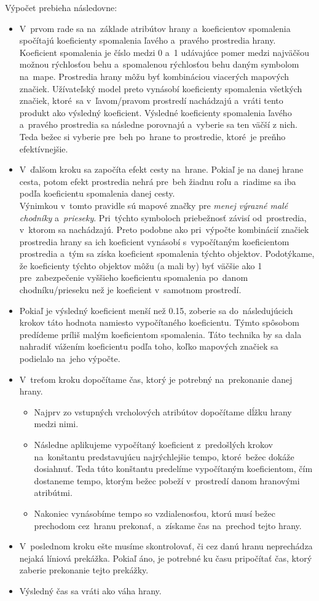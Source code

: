 Výpočet prebieha následovne:
\begin{itemize}
    \item V~prvom rade sa na~základe atribútov hrany a~koeficientov spomalenia spočítajú koeficienty spomalenia ľavého a~pravého prostredia hrany. Koeficient spomalenia je číslo medzi 0 a~1 udávajúce pomer medzi najväčšou možnou rýchlosťou behu a~spomalenou rýchlosťou behu daným symbolom na~mape. Prostredia hrany môžu byť kombináciou viacerých mapových značiek. Užívateľský model preto vynásobí koeficienty spomalenia všetkých značiek, ktoré~sa v~ľavom/pravom prostredí nachádzajú a~vráti tento produkt ako výsledný koeficient. Výsledné koeficienty spomalenia ľavého a~pravého prostredia sa následne porovnajú a~vyberie sa ten väčší z nich. Teda bežec si vyberie pre~beh po~hrane to prostredie, ktoré~je preňho efektívnejšie. 
    \item V~ďalšom kroku sa započíta efekt cesty na~hrane. Pokiaľ je na danej hrane cesta, potom efekt prostredia nehrá pre~beh žiadnu roľu a~riadime sa iba podľa koeficientu spomalenia danej cesty.\\
    Výnimkou v~tomto pravidle sú mapové značky pre \textit{menej výrazné malé chodníky} a~\textit{prieseky}. Pri~týchto symboloch priebežnosť závisí od~prostredia, v~ktorom sa nachádzajú. Preto podobne ako pri~výpočte kombinácií značiek prostredia hrany sa ich koeficient vynásobí s~vypočítaným koeficientom prostredia a~tým sa získa koeficient spomalenia týchto objektov. Podotýkame, že koeficienty týchto objektov môžu (a mali by) byť väčšie ako 1 pre~zabezpečenie vyššieho koeficientu spomalenia po~danom chodníku/prieseku než je koeficient v~samotnom prostredí. 
    \item Pokiaľ je výsledný koeficient menší než 0.15, zoberie sa do~následujúcich krokov táto hodnota namiesto vypočítaného koeficientu. Týmto spôsobom predídeme príliš malým koeficientom spomalenia. Táto technika by sa dala nahradiť vážením koeficientu podľa toho, koľko mapových značiek sa podielalo na~jeho výpočte.
    \item V~treťom kroku dopočítame čas, ktorý je potrebný na~prekonanie danej hrany. 
    \begin{itemize}
        \item Najprv zo vstupných vrcholových atribútov dopočítame dĺžku hrany medzi nimi. 
        \item Následne aplikujeme vypočítaný koeficient z~predošlých krokov na~konštantu predstavujúcu najrýchlejšie tempo, ktoré~bežec dokáže dosiahnuť. Teda túto konštantu predelíme vypočítaným koeficientom, čím dostaneme tempo, ktorým bežec pobeží v~prostredí danom hranovými atribútmi. 
        \item Nakoniec vynásobíme tempo so vzdialenosťou, ktorú musí bežec prechodom cez~hranu prekonať, a~získame čas na~prechod tejto hrany.  
    \end{itemize}
    \item V~poslednom kroku ešte musíme skontrolovať, či cez danú hranu neprechádza nejaká líniová prekážka. Pokiaľ áno, je potrebné ku času pripočítať čas, ktorý zaberie prekonanie tejto prekážky. 
    \item Výsledný čas sa vráti ako váha hrany.
    \end{itemize}

